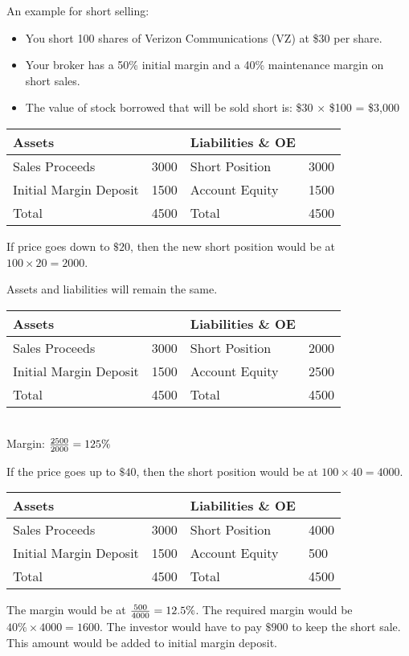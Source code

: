 \documentclass[english, 12pt]{article}
\begin{document}
\begin{exmp}
An example for short selling:
\begin{itemize}
\item You short 100 shares of Verizon Communications (VZ) at \$30 per share.
\item Your broker has a 50\% initial margin and a 40\% maintenance margin on short sales.
\item The value of stock borrowed that will be sold short is: \$30 × \$100 = \$3,000
\end{itemize}

\begin{center}
\begin{tabular}{|ll|ll|}
\hline
Assets & & Liabilities \& OE & \\
\hline
Sales Proceeds & 3000 & Short Position & 3000 \\
Initial Margin Deposit & {\color{red} 1500} & Account Equity & {\color{red} 1500} \\
\hline
Total & 4500 & Total & 4500\\
\hline
\end{tabular}
\end{center}
If price goes down to $\$20$, then the new short position would be at $100 \times 20 = 2000$.
\begin{note}
Assets and liabilities will remain the same.
\end{note}
\begin{center}
\begin{tabular}{|ll|ll|}
\hline
Assets & & Liabilities \& OE & \\
\hline
Sales Proceeds & 3000 & Short Position & {\color{red} 2000} \\
Initial Margin Deposit & 1500 & Account Equity & {\color{red} 2500} \\
\hline
Total & 4500 & Total & 4500\\
\hline
\end{tabular} \\
Margin: $\frac{2500}{2000} = 125\%$
\end{center}
\end{exmp}
\begin{exmp}
If the price goes up to $\$40$, then the short position would be at $100 \times 40 = 4000$.
\begin{center}
\begin{tabular}{|ll|ll|}
\hline
Assets & & Liabilities \& OE & \\
\hline
Sales Proceeds & 3000 & Short Position & {\color{red} 4000} \\
Initial Margin Deposit & 1500 & Account Equity & {\color{red} 500} \\
\hline
Total & 4500 & Total & 4500\\
\hline
\end{tabular}
\end{center}
The margin would be at $\frac{500}{4000} = 12.5\%$. The required margin would be $40\% \times 4000 = 1600$. The investor would have to pay $\$900$ to keep the short sale. This amount would be added to initial margin deposit.
\end{exmp}
\end{document}
